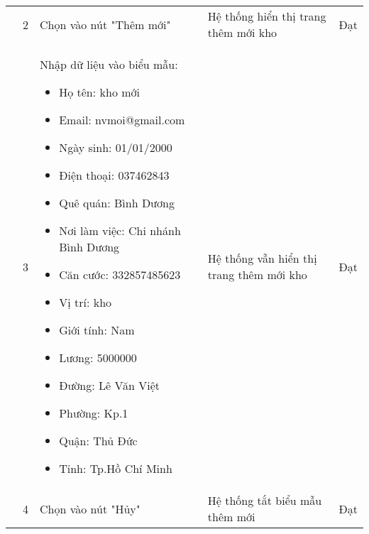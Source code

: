 {\begin{longtable}{| p{2.5cm}| p{1cm}| p{5.5cm}| p{4.5cm} | p{1.5cm} |}
        \cline{2-5}
         & 2 & Chọn vào nút "Thêm mới" & Hệ thống hiển thị trang thêm mới kho & Đạt \\
        \cline{2-5}
        & 3 & Nhập dữ liệu vào biểu mẫu:
        \begin{itemize}
            \item Họ tên: kho mới
            \item Email: nvmoi@gmail.com
            \item Ngày sinh: 01/01/2000
            \item Điện thoại: 037462843
            \item Quê quán: Bình Dương
            \item Nơi làm việc: Chi nhánh Bình Dương
            \item Căn cước: 332857485623
            \item Vị trí: kho
            \item Giới tính: Nam
            \item Lương: 5000000
            \item Đường: Lê Văn Việt
            \item Phường: Kp.1
            \item Quận: Thủ Đức 
            \item Tỉnh: Tp.Hồ Chí Minh
        \end{itemize} & Hệ thống vẫn hiển thị trang thêm mới kho & Đạt \\
        \cline{2-5}
         & 4 & Chọn vào nút "Hủy" & Hệ thống tắt biểu mẫu thêm mới & Đạt \\
        \hline
    \end{longtable} 
}


